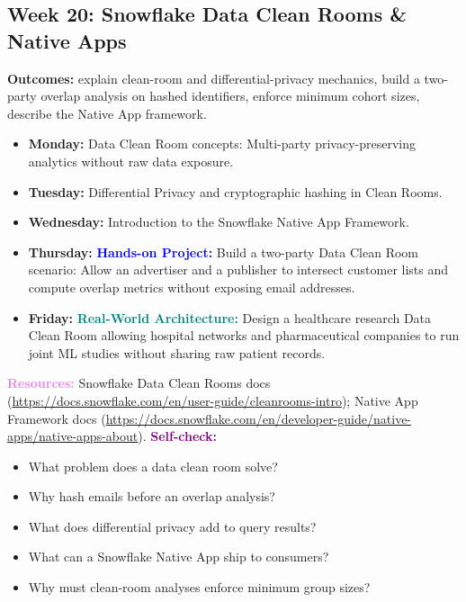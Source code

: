 \documentclass[11pt, a4paper]{article}
\newcommand{\project}[1]{\textbf{\textcolor{blue}{Hands-on Project:}} #1}
\newcommand{\usecase}[1]{\textbf{\textcolor{teal}{Real-World Architecture:}} #1}
\newcommand{\dayitem}[2]{\item \textbf{#1:} #2}
\newcommand{\resources}[1]{\vspace{1mm}\noindent\textbf{\textcolor{violet}{Resources:}} #1}
\newcommand{\selfcheck}[1]{\vspace{1mm}\noindent\textbf{\textcolor{purple}{Self-check:}} #1}
\begin{document}
\subsection*{Week 20: Snowflake Data Clean Rooms \& Native Apps}
\par\noindent\textbf{Outcomes:} explain clean-room and differential-privacy mechanics, build a two-party overlap analysis on hashed identifiers, enforce minimum cohort sizes, describe the Native App framework.
\begin{itemize}[label=-]
    \dayitem{Monday}{Data Clean Room concepts: Multi-party privacy-preserving analytics without raw data exposure.}
    \dayitem{Tuesday}{Differential Privacy and cryptographic hashing in Clean Rooms.}
    \dayitem{Wednesday}{Introduction to the Snowflake Native App Framework.}
    \dayitem{Thursday}{\project{Build a two-party Data Clean Room scenario: Allow an advertiser and a publisher to intersect customer lists and compute overlap metrics without exposing email addresses.}}
    \dayitem{Friday}{\usecase{Design a healthcare research Data Clean Room allowing hospital networks and pharmaceutical companies to run joint ML studies without sharing raw patient records.}}
\end{itemize}
\resources{Snowflake Data Clean Rooms docs (\url{https://docs.snowflake.com/en/user-guide/cleanrooms-intro}); Native App Framework docs (\url{https://docs.snowflake.com/en/developer-guide/native-apps/native-apps-about}).}
\selfcheck{\begin{itemize}[label=-, nosep, leftmargin=4mm]
    \item What problem does a data clean room solve?
    \item Why hash emails before an overlap analysis?
    \item What does differential privacy add to query results?
    \item What can a Snowflake Native App ship to consumers?
    \item Why must clean-room analyses enforce minimum group sizes?
\end{itemize}}
\end{document}
